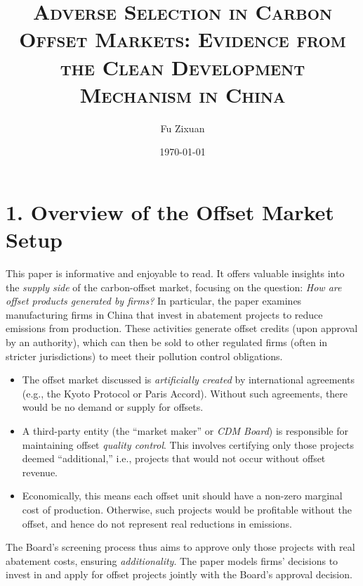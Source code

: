 \documentclass[12pt]{article}[margin=1in]
\title{\textsc{Adverse Selection in Carbon Offset Markets: Evidence from the Clean Development Mechanism
in China}}
\author{Fu Zixuan}
\date{\today}
\begin{document}
\maketitle







\section*{1. Overview of the Offset Market Setup}

This paper is informative and enjoyable to read. It offers valuable insights into the \textit{supply side} of the carbon-offset market, focusing on the question: \textit{How are offset products generated by firms?} In particular, the paper examines manufacturing firms in China that invest in abatement projects to reduce emissions from production. These activities generate offset credits (upon approval by an authority), which can then be sold to other regulated firms (often in stricter jurisdictions) to meet their pollution control obligations.

\begin{itemize}
    \item The offset market discussed is \textit{artificially created} by international agreements (e.g., the Kyoto Protocol or Paris Accord). Without such agreements, there would be no demand or supply for offsets.
    \item A third-party entity (the ``market maker'' or \textit{CDM Board}) is responsible for maintaining offset \textit{quality control}. This involves certifying only those projects deemed “additional,” i.e., projects that would not occur without offset revenue.
    \item Economically, this means each offset unit should have a non-zero marginal cost of production. Otherwise, such projects would be profitable without the offset, and hence do not represent real reductions in emissions.
\end{itemize}

The Board's screening process thus aims to approve only those projects with real abatement costs, ensuring \textit{additionality}. The paper models firms' decisions to invest in and apply for offset projects jointly with the Board's approval decision.
\end{document}
